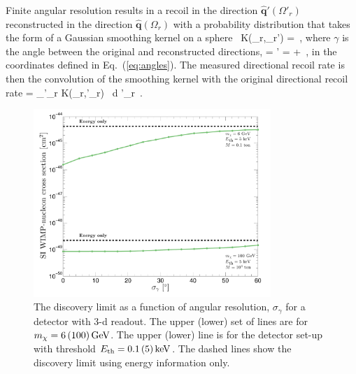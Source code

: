 Finite angular resolution results in a recoil in the direction $\hat{\textbf{q}}'(\Omega'_r)$ reconstructed in the direction $\hat{\textbf{q}}(\Omega_r)$ with a probability distribution that takes the form of a Gaussian smoothing kernel on a sphere~\cite{Copi:2005ya,Billard:2011zj}
\be
K(\Omega_r,\Omega_r') =   \,,
\ee
where $\gamma$ is the angle between the original and reconstructed directions,
\be
\cos{\gamma} = '\cdot{} = \sin{\theta} + \cos{\theta}\,,
\ee
in the coordinates defined in Eq.~(\ref{eq:angles}). The measured directional recoil rate is then the convolution of the smoothing kernel with the original directional recoil rate
\be
{} = \int_{\Omega'_r}  K(\Omega_r,\Omega'_r) \, {\rm d} \Omega'_r \,.
\ee
\begin{figure}
\begin{center}
\includegraphics[width=0.8\textwidth,angle=0]{Figures/AngRes_100GeV_6GeV-eps-converted-to.pdf}
\caption[The discovery limit as a function of angular resolution]{ The discovery limit as a function of angular resolution, $\sigma_\gamma$ for a detector with 3-d readout.  
The upper (lower) set of lines are for $m_{\chi} = 6 \, (100) \, {\rm GeV}$. The upper (lower) line is for the detector set-up with threshold $E_{\rm th} = 0.1 \, (5) \, {\rm keV}$.   
The dashed lines show the discovery limit using energy information only. }
\label{fig:angressingle}
\end{center}
\end{figure} 


